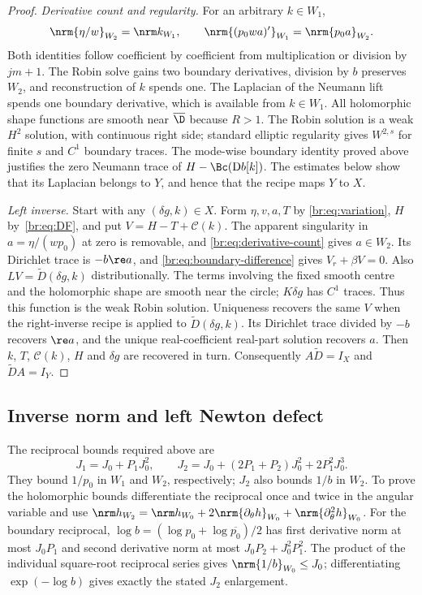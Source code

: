 \begin{proof}
\emph{Derivative count and regularity.}
For an arbitrary $k\in W_1$,
\begin{equation}\label{br:eq:derivative-count}
 \nrm{\eta/w}_{W_2}=\nrm k_{W_1},\qquad
 \nrm{(p_0wa)'}_{W_1}=\nrm{p_0a}_{W_2}.
\end{equation}
Both identities follow coefficient by coefficient from multiplication
or division by $jm+1$. The Robin solve gains two boundary derivatives,
division by $b$ preserves $W_2$, and reconstruction of $k$ spends one.
The Laplacian of the Neumann lift spends one boundary derivative,
which is available from $k\in W_1$. All holomorphic shape functions
are smooth near $\overline\D$ because $R>1$. The Robin solution is a
weak $H^2$ solution, with continuous right side; standard elliptic
regularity gives $W^{2,s}$ for finite $s$ and $C^1$ boundary traces.
The mode-wise boundary identity proved above justifies the zero
Neumann trace of $H-\Bc(\mathrm Db[k])$. The estimates below show that
its Laplacian belongs to $Y$, and hence that the recipe maps $Y$ to $X$.

\emph{Left inverse.}
Start with any $(\delta g,k)\in X$. Form $\eta,v,a,T$ by
\eqref{br:eq:variation}, $H$ by~\eqref{br:eq:DF}, and put
$V=H-T+\mathcal C(k)$. The apparent singularity in
$a=\eta/(wp_0)$ at zero is removable, and
\eqref{br:eq:derivative-count} gives $a\in W_2$.
Its Dirichlet trace is $-b\re a$, and
\eqref{br:eq:boundary-difference} gives $V_r+\beta V=0$.
Also $LV=\widetilde D(\delta g,k)$ distributionally.
The terms involving the fixed smooth centre and the holomorphic shape
are smooth near the circle; $K\delta g$ has $C^1$ traces. Thus this
function is the weak Robin solution. Uniqueness recovers the same $V$
when the right-inverse recipe is applied to $\widetilde D(\delta g,k)$.
Its Dirichlet trace divided by $-b$ recovers $\re a$, and the unique
real-coefficient real-part solution recovers $a$. Then $k$, $T$,
$\mathcal C(k)$, $H$ and $\delta g$ are recovered in turn.
Consequently $A\widetilde D=I_X$ and $\widetilde DA=I_Y$.
\end{proof}

\subsection{Inverse norm and left Newton defect}\label{br:sec:inverse-norm}
The reciprocal bounds required above are
\begin{equation}\label{br:eq:reciprocals}
 J_1=J_0+P_1J_0^2,\qquad
 J_2=J_0+(2P_1+P_2)J_0^2+2P_1^2J_0^3.
\end{equation}
They bound $1/p_0$ in $W_1$ and $W_2$, respectively; $J_2$ also bounds
$1/b$ in $W_2$. To prove the holomorphic bounds differentiate the
reciprocal once and twice in the angular variable and use
$\nrm h_{W_2}=\nrm h_{W_0}+2\nrm{\partial_\theta h}_{W_0}
+\nrm{\partial_\theta^2h}_{W_0}$. For the boundary reciprocal,
$\log b=(\log p_0+\log\overline{p_0})/2$ has first derivative norm at
most $J_0P_1$ and second derivative norm at most
$J_0P_2+J_0^2P_1^2$. The product of the individual square-root reciprocal
series gives $\nrm{1/b}_{W_0}\le J_0$; differentiating
$\exp(-\log b)$ gives exactly the stated $J_2$ enlargement.

